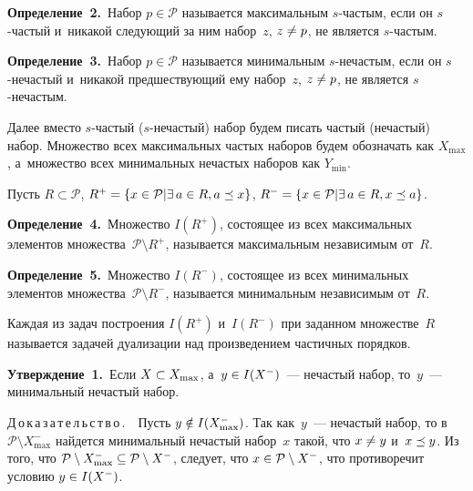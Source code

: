 \begin{multicols}{2}
    \smallskip
    
    \noindent
    \textbf{Определение~2.}\
    Набор $p \in \mathcal{P}$ называется максимальным $s$-час\-тым, если 
    он $s$-час\-тый и~никакой сле\-ду\-ющий за ним набор~$z$, $z\hm \neq p$, не является $s$-час\-тым.

    
    \smallskip
    
    \noindent
    \textbf{Определение~3.}\
    Набор $p \in \mathcal{P}$ называется минимальным $s$-не\-час\-тым, если он $s$-не\-час\-тый 
    и~никакой пред\-шест\-ву\-ющий ему набор~$z$, $z \hm\neq p$, не является $s$-не\-час\-тым.


\smallskip
    
    Далее вместо $s$-частый ($s$-не\-час\-тый) набор будем писать час\-тый (не\-час\-тый) набор. 
    Множество всех максимальных час\-тых наборов будем обозначать как $X_{\max}$, 
    а~множество всех минимальных не\-час\-тых наборов как $Y_{\min}$.
    
    Пусть $R \subset \mathcal{P}$, $R^+\hm = \{ x \in \mathcal{P} \vert \exists\, a \hm\in R, a \hm\preceq x \}$, 
    $R^- \hm= \{ x \hm\in \mathcal{P} \vert \exists\, a \hm\in R, x \hm\preceq a \}$.


    \noindent
    \textbf{Определение~4.}\
     Множество $I(R^+)$, со\-сто\-ящее из всех максимальных элементов множества~$\mathcal{P} \setminus R^+$, 
     называется максимальным независимым от~$R$.

\smallskip


   \noindent
    \textbf{Определение~5.}\
     Множество $I(R^-)$, со\-сто\-ящее из всех минимальных элементов множества~$\mathcal{P} \setminus R^-$, 
     называется минимальным независимым от~$R$.

\smallskip
    
    Каждая из задач построения $I(R^+)$ и~$I(R^-)$ 
    при заданном множестве~$R$ называется задачей дуализации над произведением час\-тич\-ных порядков.
    
    \smallskip

    \noindent
    \textbf{Утверждение~1.}\
    Если $X \hm\subset X_{\max}$, а~$y \hm\in I(X^-)$~--- не\-час\-тый набор, 
    то~$y$~--- минимальный не\-час\-тый набор.

\smallskip    
    
    \noindent
    Д\,о\,к\,а\,з\,а\,т\,е\,л\,ь\,с\,т\,в\,о\,.\  \ 
    Пусть $y \hm\notin I(X_{\max}^-)$. Так как~$y$~--- 
    нечастый набор, то в~$\mathcal{P} \setminus X^{-}_{\max}$ найдется минимальный не\-час\-тый набор~$x$ 
    такой, что $x\hm \neq y$ и~$x \hm\preceq y$. Из того, что $\mathcal{P} \setminus X^{-}_{\max} 
    \hm\subseteq \mathcal{P} \setminus X^-$, следует, что $x\hm \in \mathcal{P} \setminus X^-$, 
    что противоречит условию $y \hm\in I(X^-)$.


\end{multicols}
